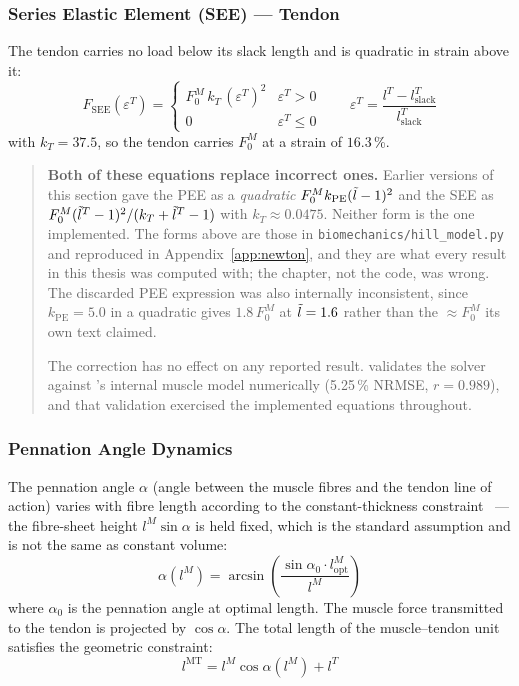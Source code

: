\subsubsection{Series Elastic Element (SEE) --- Tendon}

The tendon carries no load below its slack length and is quadratic in strain
above it:
\begin{equation}
  F_\text{SEE}(\varepsilon^T) =
  \begin{cases}
    F_0^M \, k_T \, (\varepsilon^T)^2 & \varepsilon^T > 0 \\
    0 & \varepsilon^T \leq 0
  \end{cases}
  \qquad
  \varepsilon^T = \frac{l^T - l^T_\text{slack}}{l^T_\text{slack}}
  \label{eq:see}
\end{equation}
with $k_T = 37.5$, so the tendon carries $F_0^M$ at a strain of $16.3$\,\%.

\begin{quote}
\small
\textbf{Both of these equations replace incorrect ones.} Earlier versions of this
section gave the PEE as a \emph{quadratic} $F_0^M k_\text{PE}(\tilde{l}-1)^2$ and the
SEE as $F_0^M(\tilde{l}^T-1)^2 / (k_T + \tilde{l}^T - 1)$ with $k_T \approx 0.0475$.
Neither form is the one implemented. The forms above are those in
\texttt{biomechanics/hill\_model.py} and reproduced in
Appendix~\ref{app:newton}, and they are what every result in this thesis was
computed with; the chapter, not the code, was wrong. The discarded PEE expression
was also internally inconsistent, since $k_\text{PE} = 5.0$ in a quadratic gives
$1.8\,F_0^M$ at $\tilde{l} = 1.6$ rather than the $\approx F_0^M$ its own text
claimed.

The correction has no effect on any reported result. 
validates the solver against \MuJoCo{}'s internal muscle model numerically
(5.25\,\% NRMSE, $r = 0.989$), and that validation exercised the implemented
equations throughout.
\end{quote}

\subsubsection{Pennation Angle Dynamics}

The pennation angle $\alpha$ (angle between the muscle fibres and the tendon line of
action) varies with fibre length according to the constant-thickness
constraint~\parencite{Zajac1989} --- the fibre-sheet height $l^M \sin\alpha$ is
held fixed, which is the standard assumption and is not the same as constant
volume:
\begin{equation}
  \alpha(l^M) = \arcsin\!\left(\frac{\sin\alpha_0 \cdot l^M_\text{opt}}{l^M}\right)
  \label{eq:pennation}
\end{equation}
where $\alpha_0$ is the pennation angle at optimal length. The muscle force
transmitted to the tendon is projected by $\cos\alpha$. The total length of the
muscle--tendon unit satisfies the geometric constraint:
\begin{equation}
  l^\text{MT} = l^M \cos\alpha(l^M) + l^T
  \label{eq:lmt}
\end{equation}

